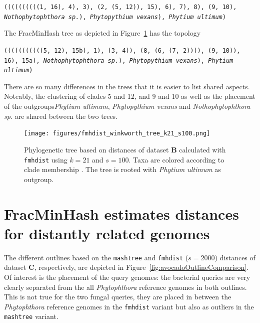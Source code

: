 \texttt{((((((((((1, 16), 4), 3), (2, (5, 12)), 15), 6),
7), 8), (9, 10), \textit{Nothophytophthora sp.}), \textit{Phytopythium vexans}),
\textit{Phytium ultimum})}

The FracMinHash tree as depicted in Figure~\ref{fig:winkworthTree} has the topology

\texttt{(((((((((((5, 12), 15b), 1), (3, 4)), (8, (6, (7, 2)))), (9, 10)), 16),
15a), \textit{Nothophytophthora sp.}), \textit{Phytopythium
vexans}), \textit{Phytium ultimum})}


There are so many differences in the trees that it is easier to list shared
aspects. Noteably, the clustering of clades 5 and 12, and 9 and 10 as well as
the placement of the outgroups\textit{Phytium ultimum}, \textit{Phytopythium
vexans} and \textit{Nothophytophthora sp.} are shared between the two trees.

\begin{figure}
  \centering
  \texttt{[image: figures/fmhdist\_winkworth\_tree\_k21\_s100.png]}
  \caption[Phylogenetic tree based on distances of dataset \textbf{B} calculated
  with \texttt{fmhdist}]{Phylogenetic tree based on distances of dataset
  \textbf{B} calculated with \texttt{fmhdist} using $k=21$ and $s=100$. Taxa are
  colored according to clade membership
  \cite{abadPhytophthoraTaxonomicPhylogenetic2023a,winkworthComparativeAnalysesComplete2022}.
  The tree is rooted with \textit{Phytium ultimum} as outgroup.}
  \label{fig:winkworthTree}
\end{figure}

\section{FracMinHash estimates distances for distantly related genomes}
The different outlines based on the \texttt{mashtree} and \texttt{fmhdist}
($s=2000$) distances of dataset \textbf{C}, respectively, are depicted in
Figure~\ref{fig:avocadoOutlineComparison}. Of interest is the placement of the
query genomes: the bacterial queries are very clearly separated from the all
\textit{Phytophthora} reference genomes in both outlines. This is not true for
the two fungal queries, they are placed in between the \textit{Phytophthora}
reference genomes in the \texttt{fmhdist} variant but also as outliers in the
\texttt{mashtree} variant.

